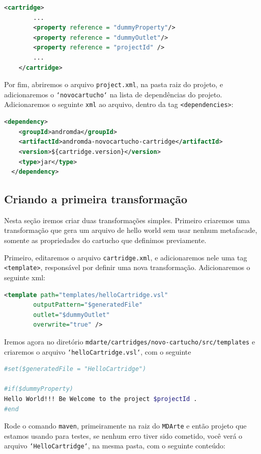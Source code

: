 \begin{lstlisting}[language=xml,
frame=single]
	<cartridge>
		...
	    <property reference = "dummyProperty"/>
	    <property reference = "dummyOutlet"/>
		<property reference = "projectId" />
		...
	</cartridge>
 \end{lstlisting}
 
 Por fim, abriremos o arquivo \texttt{project.xml}, na pasta raiz do projeto, e
 adicionaremos o \texttt{`novocartucho`} na lista de dependências do projeto.
 Adicionaremos o seguinte \texttt{xml} ao arquivo, dentro da tag
 \texttt{<dependencies>}:
 
 \begin{lstlisting}[language=xml,
frame=single]
  <dependency>
  	<groupId>andromda</groupId>
    <artifactId>andromda-novocartucho-cartridge</artifactId>
    <version>${cartridge.version}</version>
    <type>jar</type>
  </dependency>
 \end{lstlisting}
 
 
\subsection{Criando a primeira transformação}
Nesta seção iremos criar duas transformações simples. Primeiro criaremos uma
transformação que gera um arquivo de hello world sem usar nenhum metafacade,
somente as propriedades do cartucho que definimos previamente.

Primeiro, editaremos o arquivo \texttt{cartridge.xml}, e adicionaremos nele uma
tag \texttt{<template>}, responsável por definir uma nova transformação.
Adicionaremos o seguinte xml:

\begin{lstlisting}[language=xml,
frame=single]
	<template path="templates/helloCartridge.vsl"
        outputPattern="$generatedFile"
        outlet="$dummyOutlet"
        overwrite="true" />
\end{lstlisting}

Iremos agora no diretório \texttt{mdarte/cartridges/novo-cartucho/src/templates}
e criaremos o arquivo \texttt{`helloCartridge.vsl`}, com o seguinte 

\begin{lstlisting}[language=bash,
frame=single]
#set($generatedFile = "HelloCartridge")

#if($dummyProperty)
Hello World!!! Be Welcome to the project $projectId .
#end
\end{lstlisting}

Rode o comando \texttt{maven}, primeiramente na raiz do \texttt{MDArte} e então
projeto que estamos usando para testes, se nenhum erro tiver sido cometido, você
verá o arquivo \texttt{`HelloCartridge`}, na mesma pasta, com o seguinte
conteúdo:

